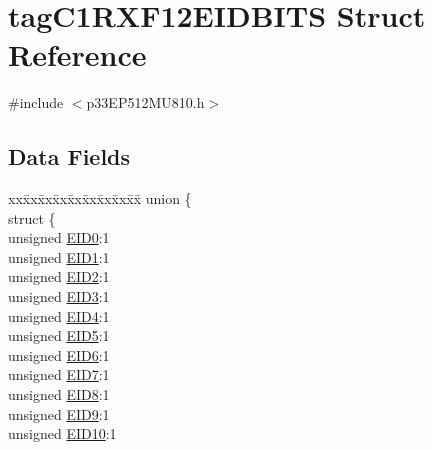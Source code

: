 \hypertarget{structtag_c1_r_x_f12_e_i_d_b_i_t_s}{}\section{tag\+C1\+R\+X\+F12\+E\+I\+D\+B\+I\+TS Struct Reference}
\label{structtag_c1_r_x_f12_e_i_d_b_i_t_s}


{\ttfamily \#include $<$p33\+E\+P512\+M\+U810.\+h$>$}

\subsection*{Data Fields}
\begin{DoxyCompactItemize}
\item 
\begin{tabbing}
xx\=xx\=xx\=xx\=xx\=xx\=xx\=xx\=xx\=\kill
union \{\\
\>struct \{\\
\>\>unsigned \hyperlink{structtag_c1_r_x_f12_e_i_d_b_i_t_s_a9da8b7b30247e4f9cd8cc056549aa9fd}{EID0}:1\\
\>\>unsigned \hyperlink{structtag_c1_r_x_f12_e_i_d_b_i_t_s_afd6c139491d147c1262f3d051c6691e9}{EID1}:1\\
\>\>unsigned \hyperlink{structtag_c1_r_x_f12_e_i_d_b_i_t_s_a36ec62d8d3c5acd5d15e6691dc099a94}{EID2}:1\\
\>\>unsigned \hyperlink{structtag_c1_r_x_f12_e_i_d_b_i_t_s_ab895f7d0ac289a0383b607cbc62eebe2}{EID3}:1\\
\>\>unsigned \hyperlink{structtag_c1_r_x_f12_e_i_d_b_i_t_s_a136d5a709d6618d40acceccb43036656}{EID4}:1\\
\>\>unsigned \hyperlink{structtag_c1_r_x_f12_e_i_d_b_i_t_s_a8dffb2d86a6c184df505ae7c71a58710}{EID5}:1\\
\>\>unsigned \hyperlink{structtag_c1_r_x_f12_e_i_d_b_i_t_s_af8a8574102515d8f1a4b7fd1685d0532}{EID6}:1\\
\>\>unsigned \hyperlink{structtag_c1_r_x_f12_e_i_d_b_i_t_s_a84c3262e67f8d5fd387ac10bde6fa9b1}{EID7}:1\\
\>\>unsigned \hyperlink{structtag_c1_r_x_f12_e_i_d_b_i_t_s_acca25e0b7d86eb499d01f85222baea87}{EID8}:1\\
\>\>unsigned \hyperlink{structtag_c1_r_x_f12_e_i_d_b_i_t_s_ac6748f73d4ada8538b06548be4f396c2}{EID9}:1\\
\>\>unsigned \hyperlink{structtag_c1_r_x_f12_e_i_d_b_i_t_s_a9cea8e77ecbb72bd3b08102412793725}{EID10}:1\\

\end{tabbing}
\end{DoxyCompactItemize}
